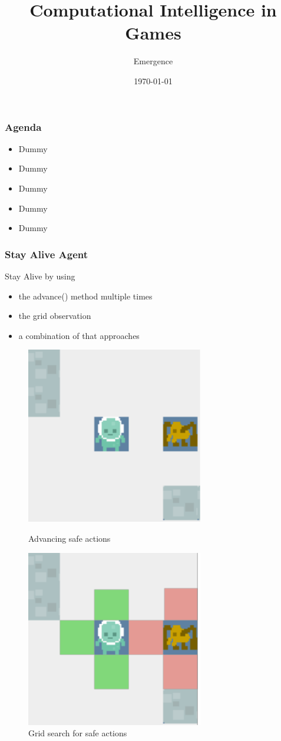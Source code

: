 \documentclass{beamer}
\title{Computational Intelligence in Games}
\author{Emergence}
\date{\today}
\institute{Otto-von-Guericke-University Magdeburg}
\begin{document}
\begin{frame}[plain]
 \titlepage
\end{frame}

\begin{frame}
\frametitle{Agenda}
\begin{itemize}
\item Dummy
\item Dummy
\item Dummy
\item Dummy
\item Dummy
\end{itemize}
\end{frame}


\begin{frame}
\frametitle{Stay Alive Agent}
Stay Alive by using
\begin{itemize}
\item the advance() method multiple times
\item the grid observation
\item a combination of that approaches
\end{itemize}

\begin{figure}
\centering
\begin{minipage}{.5\textwidth}
  \centering
\includegraphics[scale=0.8]{../report/images/safe.pdf}
\caption{Advancing safe actions}
\label{fig:safe}
\end{minipage}%
\begin{minipage}{.5\textwidth}
\centering
\includegraphics[scale=0.8]{../report/images/safe_grid.pdf}
\caption{Grid search for safe actions}
\label{fig:safe_grid}
\end{minipage}
\end{figure}




\end{frame}
\end{document}
